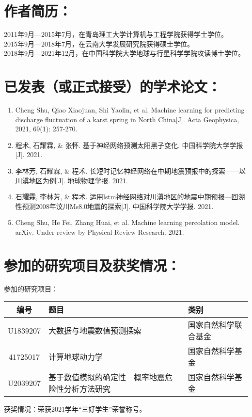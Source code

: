 \section*{作者简历：}
\noindent 2011年9月---2015年7月，在青岛理工大学计算机与工程学院获得学士学位。\\
\noindent 2015年9月---2018年7月，在云南大学发展研究院获得硕士学位。\\
\noindent 2018年9月---2021年12月，在中国科学院大学地球与行星科学学院攻读博士学位。


\section*{已发表（或正式接受）的学术论文：}
{\setlist[enumerate]{}
\begin{enumerate}[nosep]
  \item Cheng Shu, Qiao Xiaojuan, Shi Yaolin, et al. Machine learning for predicting discharge fluctuation of a karst spring in North China[J]. Acta Geophysica, 2021, 69(1): 257-270.
  \item 程术, 石耀霖, \& 张怀. 基于神经网络预测太阳黑子变化. 中国科学院大学学报[J]. 2021.
  \item 李林芳, 石耀霖, \& 程术. 长短时记忆神经网络在中期地震预报中的探索——以川滇地区为例[J]. 地球物理学报. 2021. 
  \item 石耀霖, 李林芳, \& 程术. 运用lstm神经网络对川滇地区的地震中期预报—回溯性预测2008年汶川Ms8.0地震的探索[J]. 中国科学院大学学报. 2021. 
  \item Cheng Shu, He Fei, Zhang Huai, et al. Machine learning percolation model. arXiv. Under review by Physical Review Research. 2021. 
\end{enumerate}}


\section*{参加的研究项目及获奖情况：}

\noindent 参加的研究项目：
\begin{table}[htbp]
\footnotesize
\begin{tabular}{cll}
  \toprule
  编号 & 题目 & 类别 \\
  \midrule
  U1839207 & 大数据与地震数值预测探索 & 国家自然科学联合基金 \\
  41725017 & 计算地球动力学 & 国家自然科学基金 \\
  U2039207 & 基于数值模拟的确定性---概率地震危险性分析方法研究 & 国家自然科学基金 \\
  \bottomrule
  \end{tabular}
\end{table}

\noindent 获奖情况：荣获2021学年“三好学生”荣誉称号。

\cleardoublepage[plain] 

